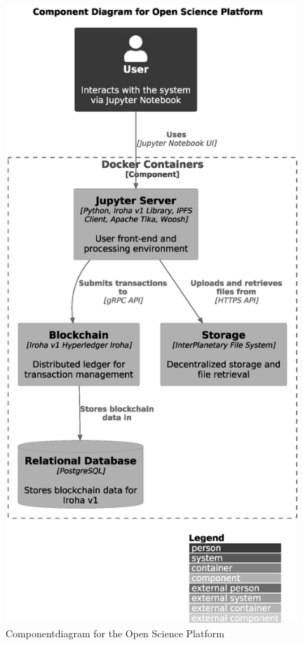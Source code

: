 \documentclass{article}
\begin{document}
\begin{figure}[htbp]
      \centering
      \includegraphics[width=0.98\textwidth, keepaspectratio]{c4_component_diagram.eps}
      \caption{Componentdiagram for the Open Science Platform}
      \label{fig:c4_component_diagram}
\end{figure}
\end{document}

